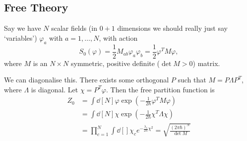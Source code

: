 \subsection{Free Theory}%
\label{sub:free_theory}

Say we have $N$ scalar fields (in $0+1$ dimensions we should really just say `variables') $\varphi_{a}$ with $a = 1, \dots, N$, with action
\begin{equation}
  S_0 (\varphi) = \frac{1}{2} M_{ab} \varphi_{a} \varphi_{b} = \frac{1}{2} \varphi^T M \varphi,
\end{equation}
where $M$ is an $N \times N$ symmetric, positive definite ($\det M > 0$) matrix.

We can diagonalise this. There exists some orthogonal $P$ such that $M = P \Lambda P^T$, where $\Lambda$ is diagonal.
Let $\chi = P^T \varphi$. Then the free partition function is
\begin{align}
  Z_0 &= \int \dd[N]{\varphi} \exp(-\frac{1}{2 \hbar} \varphi^T M \varphi) \\
      &= \int \dd[N]{\chi} \exp(- \frac{1}{2 \hbar} \chi^T \Lambda \chi) \\
      &= \prod_{c=1}^N \int \dd[]{\chi_c} e^{-\frac{\lambda_c}{2 \hbar} \chi^2} = \sqrt{\frac{(2 \pi \hbar)^N}{\det M}}
\end{align}

